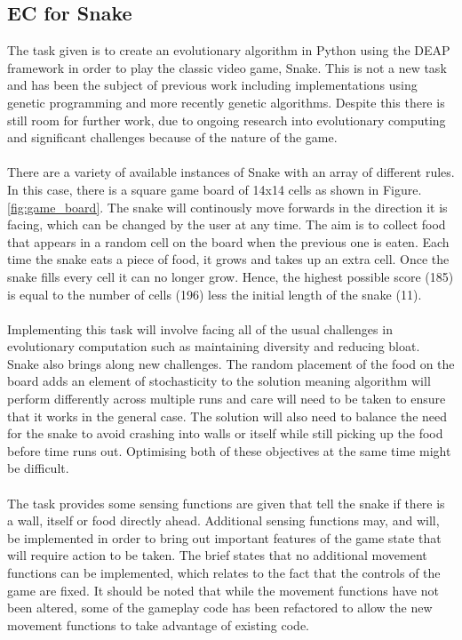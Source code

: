 \documentclass{article}
\begin{document}
\subsection{EC for Snake}
The task given is to create an evolutionary algorithm in Python using the DEAP framework in order to play the classic video game, Snake. This is not a new task and has been the subject of previous work including implementations using genetic programming\cite{snake_blog} and more recently genetic algorithms\cite{snake_paper}. Despite this there is still room for further work, due to ongoing research into evolutionary computing and significant challenges because of the nature of the game.
\\\\
There are a variety of available instances of Snake with an array of different rules. In this case, there is a square game board of 14x14 cells as shown in Figure. \ref{fig:game_board}. The snake will continously move forwards in the direction it is facing, which can be changed by the user at any time. The aim is to collect food that appears in a random cell on the board when the previous one is eaten. Each time the snake eats a piece of food, it grows and takes up an extra cell. Once the snake fills every cell it can no longer grow. Hence, the highest possible score (185) is equal to the number of cells (196) less the initial length of the snake (11).
\\\\
Implementing this task will involve facing all of the usual challenges in evolutionary computation such as maintaining diversity and reducing bloat. Snake also brings along new challenges. The random placement of the food on the board adds an element of stochasticity to the solution meaning algorithm will perform differently across multiple runs and care will need to be taken to ensure that it works in the general case. The solution will also need to balance the need for the snake to avoid crashing into walls or itself while still picking up the food before time runs out. Optimising both of these objectives at the same time might be difficult.
\\\\
The task provides some sensing functions are given that tell the snake if there is a wall, itself or food directly ahead. Additional sensing functions may, and will, be implemented in order to bring out important features of the game state that will require action to be taken. The brief states that no additional movement functions can be implemented, which relates to the fact that the controls of the game are fixed. It should be noted that while the movement functions have not been altered, some of the gameplay code has been refactored to allow the new movement functions to take advantage of existing code.
\end{document}
